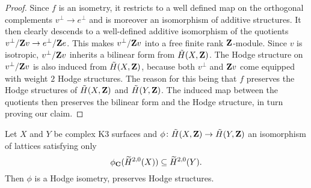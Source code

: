 \begin{proof}
    Since $f$ is an isometry, it restricts to a well defined map on the orthogonal complements $v^\perp \to e^\perp$ and is moreover an isomorphism of additive structures. It then clearly descends to a well-defined additive isomorphism of the quotients ${v}^\perp / \mathbf Z{v} \to {e}^\perp / \mathbf Z{e}$. This makes ${v}^\perp / \mathbf Z{v}$ into a free finite rank $\mathbf Z$-module. Since $v$ is isotropic, ${v}^\perp / \mathbf Z{v}$ inherits a bilinear form from $\,\tilde{\!{H}}(X, \mathbf Z)$. The Hodge structure on ${v}^\perp / \mathbf Z{v}$ is also induced from $\,\tilde{\!{H}}(X, \mathbf Z)$, because both $v^\perp$ and $\mathbf Z v$ come equipped with weight $2$ Hodge structures. The reason for this being that $f$ preserves the Hodge structures of $\,\tilde{\!{H}}(X, \mathbf Z)$ and $\,\tilde{\!{H}}(Y, \mathbf Z)$.
    The induced map between the quotients then preserves the bilinear form and the Hodge structure, in turn proving our claim. 
\end{proof}



\begin{lemma}
    \label{isometry of Mukai lattices preserving H20}
    Let $X$ and $Y$ be complex K3 surfaces and $\phi \colon \,\tilde{\!{H}}(X, \mathbf Z) \to \,\tilde{\!{H}}(Y, \mathbf Z)$ an isomorphism of lattices satisfying only
    \begin{equation}
        \label{eq: H20 is mapped to H20}
        \phi_\mathbf C(\widetilde{H}^{2,0}(X)) \subseteq \widetilde{H}^{2,0}(Y).
    \end{equation}
    Then $\phi$ is a Hodge isometry, \ie preserves Hodge structures. 
\end{lemma}

